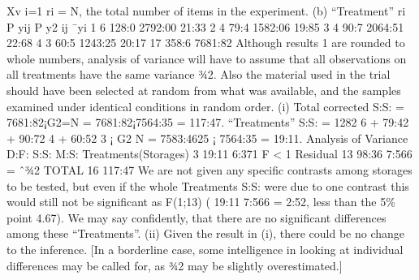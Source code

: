 \documentclass[a4paper,12pt]{article}
\begin{document}
Xv
i=1
ri = N,
the total number of items in the experiment.
(b)
“Treatment” ri
P
yij
P
y2
ij ¯yi
1 6 128:0 2792:00 21:33
2 4 79:4 1582:06 19:85
3 4 90:7 2064:51 22:68
4 3 60:5 1243:25 20:17
17 358:6 7681:82
Although results 1 are rounded to whole numbers, analysis of variance will
have to assume that all observations on all treatments have the same variance
¾2. Also the material used in the trial should have been selected at
random from what was available, and the samples examined under identical
conditions in random order.
(i) Total corrected S:S: = 7681:82¡G2=N = 7681:82¡7564:35 = 117:47. “Treatments”
S:S: =
1282
6
+
79:42 + 90:72
4
+
60:52
3
¡
G2
N
= 7583:4625 ¡ 7564:35 = 19:11.
Analysis of Variance D:F: S:S: M:S:
Treatments(Storages) 3 19:11 6:371 F < 1
Residual 13 98:36 7:566 = ˆ¾2
TOTAL 16 117:47
We are not given any specific contrasts among storages to be tested, but
even if the whole Treatments S:S: were due to one contrast this would still
not be significant as F(1;13) ( 19:11
7:566 = 2:52, less than the 5\% point 4.67). We
may say confidently, that there are no significant differences among these
“Treatments”.
(ii) Given the result in (i), there could be no change to the inference. [In a
borderline case, some intelligence in looking at individual differences may be
called for, as ¾2 may be slightly overestimated.]
\end{document}
